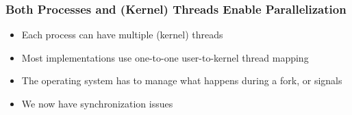   \begin{frame}
    \frametitle{Both Processes and (Kernel) Threads Enable Parallelization}

    \begin{itemize}
      \item Each process can have multiple (kernel) threads
      \item Most implementations use one-to-one user-to-kernel thread mapping
      \item The operating system has to manage what happens during a fork, or signals
      \item We now have synchronization issues
    \end{itemize}
  \end{frame}

